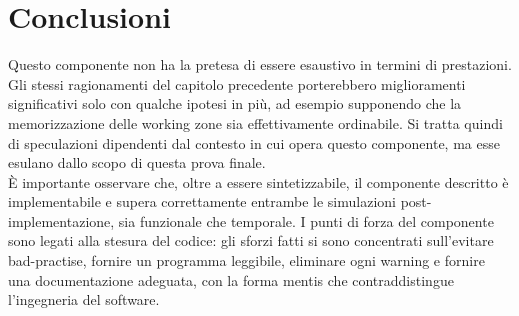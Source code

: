 \documentclass[12pt,a4paper,titlepage]{article}
\begin{document}
		\section{Conclusioni}
			Questo componente non ha la pretesa di essere esaustivo in termini di prestazioni. Gli stessi ragionamenti del capitolo precedente porterebbero miglioramenti significativi solo con qualche ipotesi in più, ad esempio supponendo che la memorizzazione delle working zone sia effettivamente ordinabile. Si tratta quindi di speculazioni dipendenti dal contesto in cui opera questo componente, ma esse esulano dallo scopo di questa prova finale.\\
			È importante osservare che, oltre a essere sintetizzabile, il componente descritto è implementabile e supera correttamente entrambe le simulazioni post-implementazione, sia funzionale che temporale. I punti di forza del componente sono legati alla stesura del codice: gli sforzi fatti si sono concentrati sull'evitare bad-practise, fornire un programma leggibile, eliminare ogni warning e fornire una documentazione adeguata, con la forma mentis che contraddistingue l'ingegneria del software.
\end{document}
